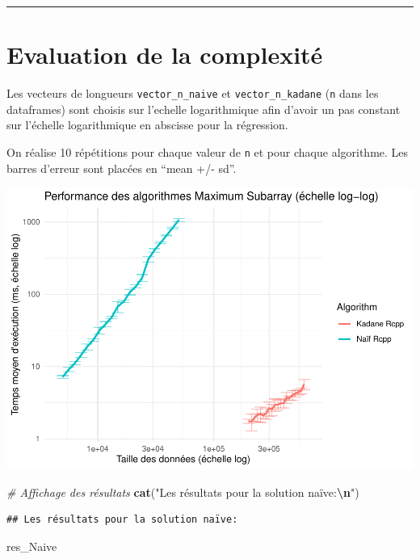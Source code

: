 \documentclass[
]{article}
\newenvironment{Shaded}{\begin{snugshade}}{\end{snugshade}}
\newcommand{\CommentTok}[1]{\textcolor[rgb]{0.56,0.35,0.01}{\textit{#1}}}
\newcommand{\FunctionTok}[1]{\textcolor[rgb]{0.13,0.29,0.53}{\textbf{#1}}}
\newcommand{\NormalTok}[1]{#1}
\newcommand{\SpecialCharTok}[1]{\textcolor[rgb]{0.81,0.36,0.00}{\textbf{#1}}}
\newcommand{\StringTok}[1]{\textcolor[rgb]{0.31,0.60,0.02}{#1}}
\begin{document}
\begin{center}\rule{0.5\linewidth}{0.5pt}\end{center}

\section{Evaluation de la
complexité}\label{evaluation-de-la-complexituxe9}

Les vecteurs de longueurs \texttt{vector\_n\_naive} et
\texttt{vector\_n\_kadane} (\texttt{n} dans les dataframes) sont choisis
sur l'echelle logarithmique afin d'avoir un pas constant sur l'échelle
logarithmique en abscisse pour la régression.

On réalise 10 répétitions pour chaque valeur de \texttt{n} et pour
chaque algorithme. Les barres d'erreur sont placées en ``mean +/- sd''.

\includegraphics{MaxSubarray1D_files/figure-latex/simu complexite-1.pdf}

\begin{Shaded}
\begin{Highlighting}[]
\CommentTok{\# Affichage des résultats}
\FunctionTok{cat}\NormalTok{(}\StringTok{"Les résultats pour la solution naïve:}\SpecialCharTok{\textbackslash{}n}\StringTok{"}\NormalTok{)}
\end{Highlighting}
\end{Shaded}

\begin{verbatim}
## Les résultats pour la solution naïve:
\end{verbatim}

\begin{Shaded}
\begin{Highlighting}[]
\NormalTok{res\_Naive}
\end{Highlighting}
\end{Shaded}
\end{document}
